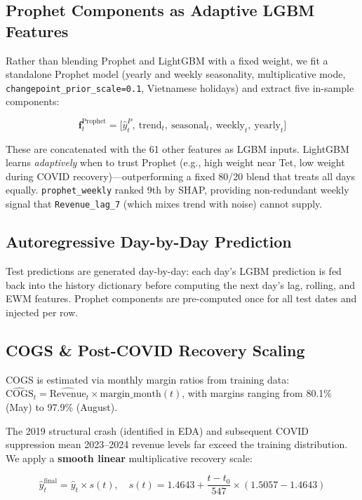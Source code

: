 \documentclass{article}
\begin{document}
\subsection{Prophet Components as Adaptive LGBM Features}

Rather than blending Prophet and LightGBM with a fixed weight, we fit a standalone Prophet model (yearly and weekly seasonality, multiplicative mode, \texttt{changepoint\_prior\_scale=0.1}, Vietnamese holidays) and extract five in-sample components:

\[
\mathbf{f}^{\text{Prophet}}_t = \bigl[\hat{y}^P_t,\ \text{trend}_t,\ \text{seasonal}_t,\ \text{weekly}_t,\ \text{yearly}_t\bigr]
\]

These are concatenated with the 61 other features as LGBM inputs. LightGBM learns \emph{adaptively} when to trust Prophet (e.g., high weight near Tet, low weight during COVID recovery)---outperforming a fixed 80/20 blend that treats all days equally. \texttt{prophet\_weekly} ranked 9th by SHAP, providing non-redundant weekly signal that \texttt{Revenue\_lag\_7} (which mixes trend with noise) cannot supply.

\subsection{Autoregressive Day-by-Day Prediction}

Test predictions are generated day-by-day: each day's LGBM prediction is fed back into the history dictionary before computing the next day's lag, rolling, and EWM features. Prophet components are pre-computed once for all test dates and injected per row.

\subsection{COGS \& Post-COVID Recovery Scaling}

COGS is estimated via monthly margin ratios from training data:
$\widehat{\text{COGS}}_t = \widehat{\text{Revenue}}_t \times \text{margin\_month}(t)$,
with margins ranging from 80.1\% (May) to 97.9\% (August).

The 2019 structural crash (identified in EDA) and subsequent COVID suppression mean 2023--2024 revenue levels far exceed the training distribution. We apply a \textbf{smooth linear} multiplicative recovery scale:

\[
\hat{y}^{\text{final}}_t = \hat{y}_t \times s(t), \quad
s(t) = 1.4643 + \frac{t - t_0}{547} \times (1.5057 - 1.4643)
\]
\end{document}
